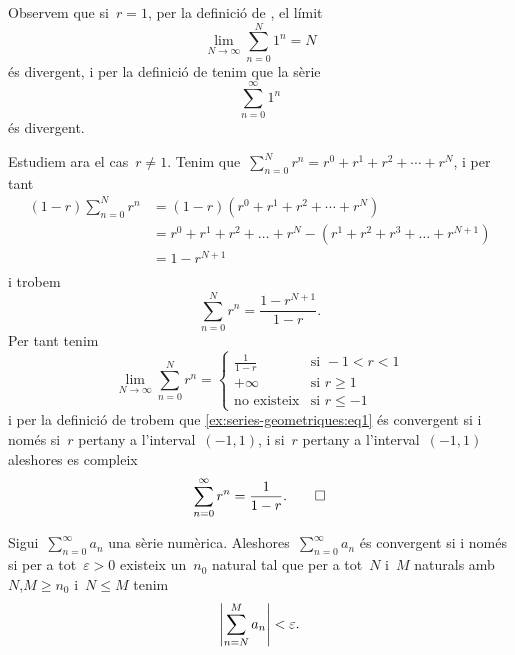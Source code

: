 \documentclass[../analisi-matematica.tex]{subfiles}
\begin{document}
    \begin{solution}
        Observem que si~\(r=1\), per la definició de , el límit
        \[
            \lim_{N\to\infty}\sum_{n=0}^{N}1^{n}=N
        \]
        és divergent, i per la definició de  tenim que la sèrie
        \[
            \sum_{n=0}^{\infty}1^{n}
        \]
        és divergent.

        Estudiem ara el cas~\(r\neq1\).
        Tenim que~\(\sum_{n=0}^{N}r^{n}=r^{0}+r^{1}+r^{2}+\cdots+r^{N}\), i per tant
        \begin{align*}
            (1-r)\sum_{n=0}^{N}r^{n}&=(1-r)(r^{0}+r^{1}+r^{2}+\cdots+r^{N})\\
            &=r^{0}+r^{1}+r^{2}+\dots+r^{N}-(r^{1}+r^{2}+r^{3}+\dots+r^{N+1})\\
            &=1-r^{N+1}\\
        \end{align*}
        i trobem
        \begin{equation*}
            \sum_{n=0}^{N}r^{n}=\frac{1-r^{N+1}}{1-r}.
        \end{equation*}
        Per tant tenim
        \[\lim_{N\to\infty}\sum_{n=0}^{N}r^{n}=
        \begin{cases}
            \displaystyle \frac{1}{1-r} & \text{si }-1<r<1 \\
            +\infty & \text{si }r\geq1 \\
            \text{no existeix} & \text{si }r\leq-1
        \end{cases}\]
        i per la definició de  trobem que \eqref{ex:series-geometriques:eq1} és convergent si i només si~\(r\) pertany a l'interval~\((-1,1)\), i si~\(r\) pertany a l'interval~\((-1,1)\) aleshores es compleix
        \begin{equation*}
            \sum_{n=0}^{\infty}r^{n}=\frac{1}{1-r}.\qedhere
        \end{equation*}
    \end{solution}
    \begin{theorem}
        \label{thm:Condicio-de-Cauchy-per-series-numeriques}
        Sigui~\(\sum_{n=0}^{\infty}a_{n}\) una sèrie numèrica.
        Aleshores~\(\sum_{n=0}^{\infty}a_{n}\) és convergent si i només si per a tot~\(\varepsilon>0\) existeix un~\(n_{0}\) natural tal que per a tot~\(N\) i~\(M\) naturals amb~\(N\),\(M\geq n_{0}\) i~\(N\leq M\) tenim
        \[
            \abs{\sum_{n=N}^{M}a_{n}}<\varepsilon.
        \]
    \end{theorem}
\end{document}
